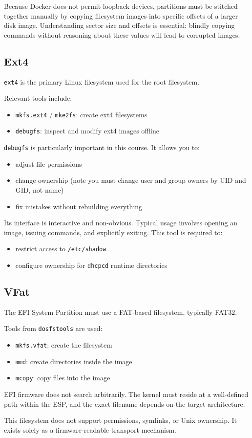 \documentclass{../juni}
\begin{document}
Because Docker does not permit loopback devices, partitions must be stitched
together manually by copying filesystem images into specific offsets of a larger
disk image. Understanding sector size and offsets is essential; blindly copying
commands without reasoning about these values will lead to corrupted images.

\subsection{Ext4}

\texttt{ext4} is the primary Linux filesystem used for the root filesystem.

Relevant tools include:
\begin{itemize}
  \item \texttt{mkfs.ext4} / \texttt{mke2fs}: create ext4 filesystems
  \item \texttt{debugfs}: inspect and modify ext4 images offline
\end{itemize}

\texttt{debugfs} is particularly important in this course. It allows you to:
\begin{itemize}
  \item adjust file permissions
  \item change ownership (note you must change user and group owners by UID and GID, not name)
  \item fix mistakes without rebuilding everything
\end{itemize}

Its interface is interactive and non-obvious. Typical usage involves opening an
image, issuing commands, and explicitly exiting. This tool is required to:
\begin{itemize}
  \item restrict access to \texttt{/etc/shadow}
  \item configure ownership for \texttt{dhcpcd} runtime directories
\end{itemize}

\subsection{VFat}

The EFI System Partition must use a FAT-based filesystem, typically FAT32.

Tools from \texttt{dosfstools} are used:
\begin{itemize}
  \item \texttt{mkfs.vfat}: create the filesystem
  \item \texttt{mmd}: create directories inside the image
  \item \texttt{mcopy}: copy files into the image
\end{itemize}

EFI firmware does not search arbitrarily. The kernel must reside at a
well-defined path within the ESP, and the exact filename depends on the target
architecture.

This filesystem does not support permissions, symlinks, or Unix ownership.
It exists solely as a firmware-readable transport mechanism.
\end{document}
